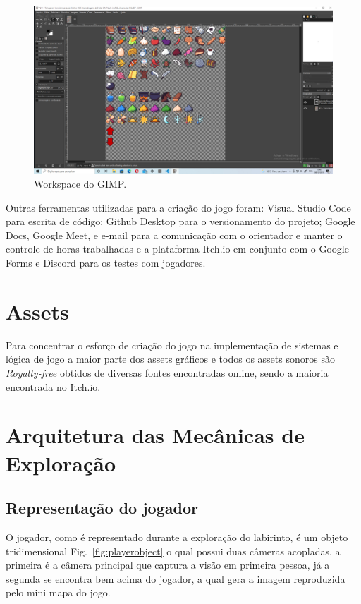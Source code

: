 \begin{figure}[h!]
 \centering
  \includegraphics[width=0.70\linewidth]{gimp.jpg}
  \caption{Workspace do GIMP.}
  \label{fig:gimp}
\end{figure}

Outras ferramentas utilizadas para a criação do jogo foram: Visual Studio Code para escrita de código;
Github Desktop para o versionamento do projeto; Google Docs, Google Meet, e e-mail para a
comunicação com o orientador e manter o controle de horas trabalhadas e a plataforma Itch.io em conjunto com o Google Forms e Discord para os testes com jogadores.

\section{Assets}

Para concentrar o esforço de criação do jogo na implementação de sistemas e lógica de jogo a maior parte dos assets gráficos e todos os assets sonoros são \emph{Royalty-free} obtidos de diversas fontes encontradas online, sendo a maioria encontrada no Itch.io. %


\section{Arquitetura das Mecânicas de Exploração}


\subsection{Representação do jogador}

O jogador, como é representado durante a exploração do labirinto, é um objeto tridimensional Fig.~\ref{fig:playerobject} o qual possui duas câmeras acopladas, a primeira é a câmera principal que captura a visão em primeira pessoa, já a segunda se encontra bem acima do jogador, a qual gera a imagem reproduzida pelo mini mapa do jogo.
 

